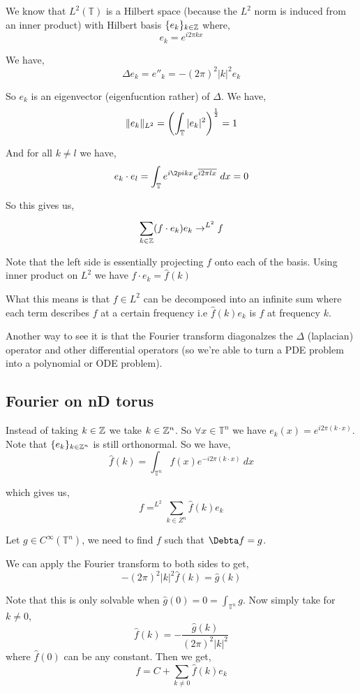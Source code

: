 We know that $L^2(\mathbb{T})$ is a Hilbert space (because the $L^2$ norm is induced from an inner product) with Hilbert basis $\{e_k\}_{k \in \mathbb{Z}}$ where, 
\[
  e_k  = e^{i 2\pi k x}
\]

We have, 
\[
  \Delta e_k = e''_k = -(2\pi)^2 |k|^2 e_k
\]

So $e_k$ is an eigenvector (eigenfucntion rather) of $\Delta$. We have, 
\[
  \lVert e_k\rVert_{L^2} = \left ( \int_{\mathbb{T}}^{} |e_k|^2\right )^{\frac{1}{2}} = 1
\]

And for all $k \ne l$ we have, 
\[
  e_k \cdot e_l = \int_{\mathbb{T}}^{} e^{i \2pi k x} e^{\overline{i 2\pi l x}} \ dx = 0
\]

So this gives us, 
\[
  \sum_{k \in \mathbb{Z}}^{} (f \cdot e_k) e_k \to^{L^2} f 
\]

Note that the left side is essentially projecting $f$ onto each of the basis. Using inner product on $L^2$ we have $f \cdot e_k = \hat{f}(k)$

\vspace{1em}

What this means is that $f \in L^2$ can be decomposed into an infinite sum where each term describes $f$ at a certain frequency i.e $\hat{f}(k) e_k$ is $f$ at frequency $k$.

\vspace{1em}

Another way to see it is that the Fourier transform diagonalzes the $\Delta$ (laplacian) operator and other differential operators (so we're able to turn a PDE problem into a polynomial or ODE problem).


\subsection{Fourier on nD torus}
Instead of taking $k \in \mathbb{Z}$ we take $k \in \mathbb{Z}^{n}$. So $\forall x \in \mathbb{T}^{n}$ we have $e_k(x) = e^{i 2\pi (k \cdot x)}$. Note that $\{e_k\}_{k \in \mathbb{Z}^{n}}$ is still orthonormal. So we have, 
\[
  \hat{f}(k) = \int_{\mathbb{T}^{n}}^{} f(x) e^{-i 2 \pi (k \cdot x)} \ dx
\]

which gives us, 
\[
  f =^{L^2} \sum_{k \in Z^{n}}^{}  \hat{f}(k) e_k
\]

\begin{eg}
  Let $g \in C^{\infty}(\mathbb{T}^{n})$, we need to find $f$ such that $\Debta f = g$.
\end{eg}
\begin{solution}
 We can apply the Fourier transform to both sides to get, 
 \[
   -(2\pi)^2 |k|^2 \hat{f}(k) = \hat{g}(k)
 \]

 Note that this is only solvable when $\hat{g}(0) = 0 = \int_{\mathbb{T}^{n}}^{} g$. Now simply take for $k \ne 0$, 
 \[
   \hat{f}(k) = - \frac{\hat{g}(k)}{(2\pi)^2 |k|^2}
 \]
 where $\hat{f}(0)$ can be any constant. Then we get, 
 \[
   f = C + \sum_{k \ne 0}^{} \hat{f}(k) e_k 
 \]

\end{solution}


